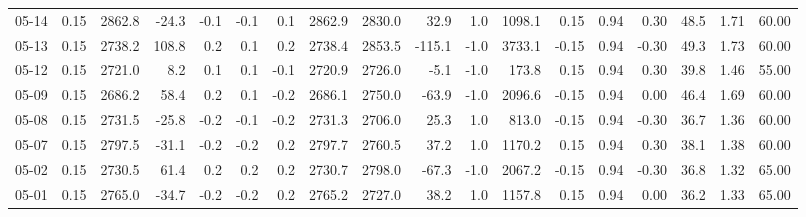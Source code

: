 \begin{threeparttable}
{\begin{tabular}{lrrrrrrrrrrrrrrrrr}
  05-14 &     0.15 & 2862.8 &             -24.3 &              -0.1 &               -0.1 &                0.1 & 2862.9 & 2830.0 &       32.9 &                      1.0 &              1098.1 &       0.15 &      0.94 &           0.30 &             48.5 &            1.71 &                  60.00 \\
  05-13 &     0.15 & 2738.2 &             108.8 &               0.2 &                0.1 &                0.2 & 2738.4 & 2853.5 &     -115.1 &                     -1.0 &              3733.1 &      -0.15 &      0.94 &          -0.30 &             49.3 &            1.73 &                  60.00 \\
  05-12 &     0.15 & 2721.0 &               8.2 &               0.1 &                0.1 &               -0.1 & 2720.9 & 2726.0 &       -5.1 &                     -1.0 &               173.8 &       0.15 &      0.94 &           0.30 &             39.8 &            1.46 &                  55.00 \\
  05-09 &     0.15 & 2686.2 &              58.4 &               0.2 &                0.1 &               -0.2 & 2686.1 & 2750.0 &      -63.9 &                     -1.0 &              2096.6 &      -0.15 &      0.94 &           0.00 &             46.4 &            1.69 &                  60.00 \\
  05-08 &     0.15 & 2731.5 &             -25.8 &              -0.2 &               -0.1 &               -0.2 & 2731.3 & 2706.0 &       25.3 &                      1.0 &               813.0 &      -0.15 &      0.94 &          -0.30 &             36.7 &            1.36 &                  60.00 \\
  05-07 &     0.15 & 2797.5 &             -31.1 &              -0.2 &               -0.2 &                0.2 & 2797.7 & 2760.5 &       37.2 &                      1.0 &              1170.2 &       0.15 &      0.94 &           0.30 &             38.1 &            1.38 &                  60.00 \\
  05-02 &     0.15 & 2730.5 &              61.4 &               0.2 &                0.2 &                0.2 & 2730.7 & 2798.0 &      -67.3 &                     -1.0 &              2067.2 &      -0.15 &      0.94 &          -0.30 &             36.8 &            1.32 &                  65.00 \\
  05-01 &     0.15 & 2765.0 &             -34.7 &              -0.2 &               -0.2 &                0.2 & 2765.2 & 2727.0 &       38.2 &                      1.0 &              1157.8 &       0.15 &      0.94 &           0.00 &             36.2 &            1.33 &                  65.00 \\

\end{tabular}}
\end{threeparttable}
